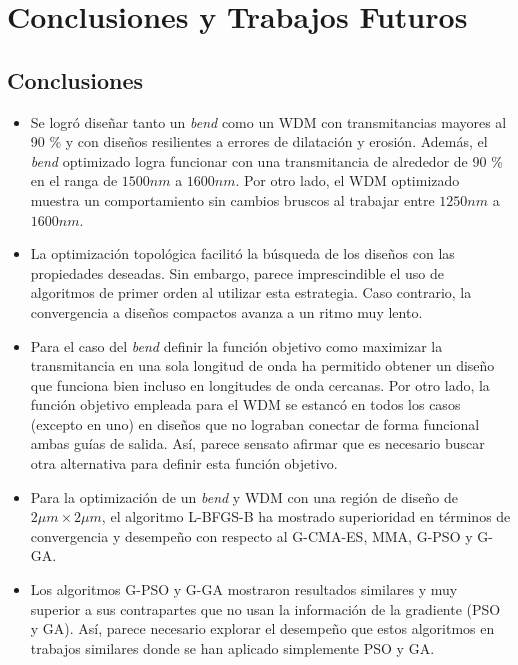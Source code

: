\chapter{Conclusiones y Trabajos Futuros}\label{chapter:conclution}

\section{Conclusiones}

\begin{itemize}

  \item Se logró diseñar tanto un \emph{bend} como un WDM con transmitancias mayores al 90 \% y
        con diseños resilientes a errores de dilatación y erosión.
        Además, el \emph{bend} optimizado logra funcionar con una transmitancia de alrededor de 90 \%
        en el ranga de $1500nm$ a $1600 nm$. Por otro lado, el WDM optimizado muestra un comportamiento
        sin cambios bruscos al trabajar entre $1250 nm$ a $1600 nm$.

  \item La optimización topológica facilitó la búsqueda de los diseños con las propiedades deseadas.
        Sin embargo, parece imprescindible el uso de algoritmos de primer orden al utilizar
        esta estrategia. Caso contrario, la convergencia a diseños compactos avanza a un ritmo muy lento.

  \item Para el caso del \emph{bend} definir la función objetivo como maximizar la transmitancia en una
        sola longitud de onda ha permitido obtener un diseño que funciona bien incluso en longitudes de
        onda cercanas. Por otro lado, la función objetivo empleada para el WDM se estancó en todos los
        casos (excepto en uno) en diseños que no lograban conectar de forma funcional ambas guías de salida.
        Así, parece sensato afirmar que es necesario buscar otra alternativa para definir esta función
objetivo.

  \item Para la optimización de un \emph{bend} y WDM con una región de diseño de $2 \mu m \times 2 \mu m$,
        el algoritmo L-BFGS-B ha mostrado superioridad en términos de convergencia y desempeño con respecto
        al G-CMA-ES, MMA, G-PSO y G-GA. 

  \item Los algoritmos G-PSO y G-GA mostraron resultados similares y muy superior a sus contrapartes que no
        usan la información de la gradiente (PSO y GA).
        Así, parece necesario explorar el desempeño que estos algoritmos en trabajos similares
        donde se han aplicado simplemente PSO y GA.


\end{itemize}
